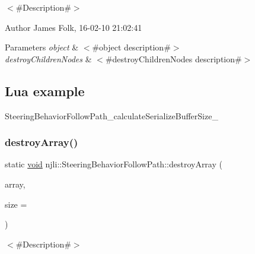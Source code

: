 $<$\#\+Description\#$>$ 

\begin{DoxyAuthor}{Author}
James Folk, 16-\/02-\/10 21\+:02\+:41
\end{DoxyAuthor}

\begin{DoxyParams}{Parameters}
{\em object} & $<$\#object description\#$>$ \\
\hline
{\em destroy\+Children\+Nodes} & $<$\#destroy\+Children\+Nodes description\#$>$\\
\hline
\end{DoxyParams}
\hypertarget{classnjli_1_1_steering_behavior_wander_ex1}{}\subsection{Lua example}\label{classnjli_1_1_steering_behavior_wander_ex1}

\begin{DoxyCodeInclude}
\end{DoxyCodeInclude}
Steering\+Behavior\+Follow\+Path\+\_\+calculate\+Serialize\+Buffer\+Size\+\_\+ \mbox{\label{classnjli_1_1_steering_behavior_follow_path_a257506416f98a717aaee51eb4e8450fe}} 
\subsubsection{\texorpdfstring{destroy\+Array()}{destroyArray()}}
{\footnotesize\ttfamily static \mbox{\hyperlink{_thread_8h_af1e856da2e658414cb2456cb6f7ebc66}{void}} njli\+::\+Steering\+Behavior\+Follow\+Path\+::destroy\+Array (\begin{DoxyParamCaption}\item[{\mbox{\hyperlink{classnjli_1_1_steering_behavior_follow_path}{Steering\+Behavior\+Follow\+Path}} $\ast$$\ast$}]{array,  }\item[{const \mbox{\hyperlink{_util_8h_a10e94b422ef0c20dcdec20d31a1f5049}{u32}}}]{size = {} }\end{DoxyParamCaption})\hspace{0.3cm}{\ttfamily [static]}}



$<$\#\+Description\#$>$ 

